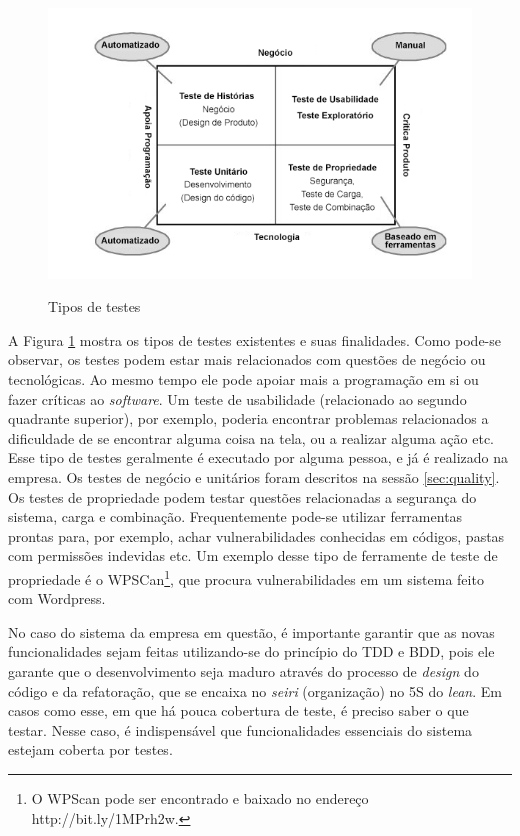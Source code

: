 \begin{figure}[htb!]
\begin{center}
\caption{Tipos de testes}
\label{fig:tipo_testes}
\includegraphics[width=14cm]{assets/testetab} \\
\end{center}
\end{figure}

A Figura \ref{fig:tipo_testes} mostra os tipos de testes existentes e suas finalidades. Como pode-se observar, os testes podem estar mais relacionados com questões de negócio ou tecnológicas. Ao mesmo tempo ele pode apoiar mais a programação em si ou fazer críticas ao \textit{software}. Um teste de usabilidade (relacionado ao segundo quadrante superior), por exemplo, poderia encontrar problemas relacionados a dificuldade de se encontrar alguma coisa na tela, ou a realizar alguma ação etc. Esse tipo de testes geralmente é executado por alguma pessoa, e já é realizado na empresa. Os testes de negócio e unitários foram descritos na sessão \ref{sec:quality}. Os testes de propriedade podem testar questões relacionadas a segurança do sistema, carga e combinação. Frequentemente pode-se utilizar ferramentas prontas para, por exemplo, achar vulnerabilidades conhecidas em códigos, pastas com permissões indevidas etc. Um exemplo desse tipo de ferramente de teste de propriedade é o WPSCan\footnote{O WPScan pode ser encontrado e baixado no endereço http://bit.ly/1MPrh2w.}, que procura vulnerabilidades em um sistema feito com Wordpress.

No caso do sistema da empresa em questão, é importante garantir que as novas funcionalidades sejam feitas utilizando-se do princípio do TDD e BDD, pois ele garante que o desenvolvimento seja maduro através do processo de \textit{design} do código e da refatoração, que se encaixa no \textit{seiri} (organização) no 5S do \textit{lean}. Em casos como esse, em que há pouca cobertura de teste, é preciso saber o que testar. Nesse caso, é indispensável que funcionalidades essenciais do sistema estejam coberta por testes.


